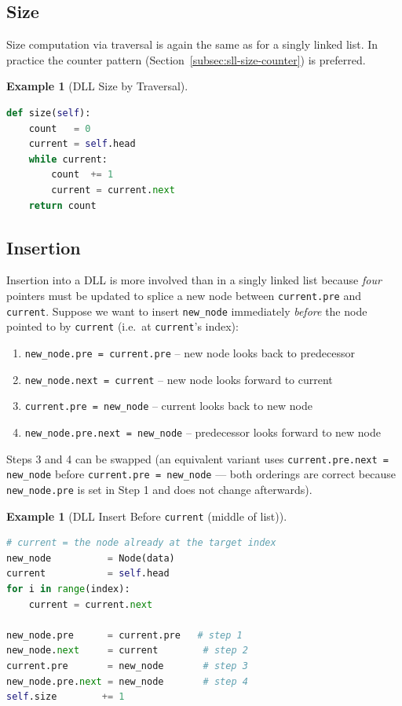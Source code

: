 \documentclass[11pt, a4paper, notitlepage]{report}
\theoremstyle{definition}
\theoremstyle{remark}
\theoremstyle{definition}
\newtheorem{example}[theorem]{Example}
\begin{document}
\subsection{Size}
\label{subsec:dll-size}

Size computation via traversal is again the same as for a singly linked list.
In practice the counter pattern (Section~\ref{subsec:sll-size-counter}) is
preferred.

\begin{example}[DLL Size by Traversal]
\leavevmode
\begin{lstlisting}[language=Python]
def size(self):
    count   = 0
    current = self.head
    while current:
        count  += 1
        current = current.next
    return count
\end{lstlisting}
\end{example}

\subsection{Insertion}
\label{subsec:dll-insert}

Insertion into a DLL is more involved than in a singly linked list because
\emph{four} pointers must be updated to splice a new node between
\texttt{current.pre} and \texttt{current}. Suppose we want to insert
\texttt{new\_node} immediately \emph{before} the node pointed to by
\texttt{current} (i.e.\ at \texttt{current}'s index):

\begin{enumerate}
  \item \texttt{new\_node.pre = current.pre} \quad -- new node looks back to predecessor
  \item \texttt{new\_node.next = current} \quad -- new node looks forward to current
  \item \texttt{current.pre = new\_node} \quad -- current looks back to new node
  \item \texttt{new\_node.pre.next = new\_node} \quad -- predecessor looks forward to new node
\end{enumerate}

Steps 3 and 4 can be swapped (an equivalent variant uses
\texttt{current.pre.next = new\_node} before \texttt{current.pre = new\_node}
--- both orderings are correct because \texttt{new\_node.pre} is set in Step 1
and does not change afterwards).

\begin{example}[DLL Insert Before \texttt{current} (middle of list)]
\leavevmode
\begin{lstlisting}[language=Python]
# current = the node already at the target index
new_node          = Node(data)
current           = self.head
for i in range(index):
    current = current.next

new_node.pre      = current.pre   # step 1
new_node.next     = current        # step 2
current.pre       = new_node       # step 3
new_node.pre.next = new_node       # step 4
self.size        += 1
\end{lstlisting}
\end{example}
\end{document}
